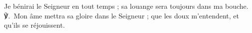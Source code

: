 Je bénirai le Seigneur en tout temps ; sa louange sera toujours dans ma bouche.
℣.~Mon âme mettra sa gloire dans le Seigneur ; que les doux m’entendent, et qu’ils se réjouissent.
